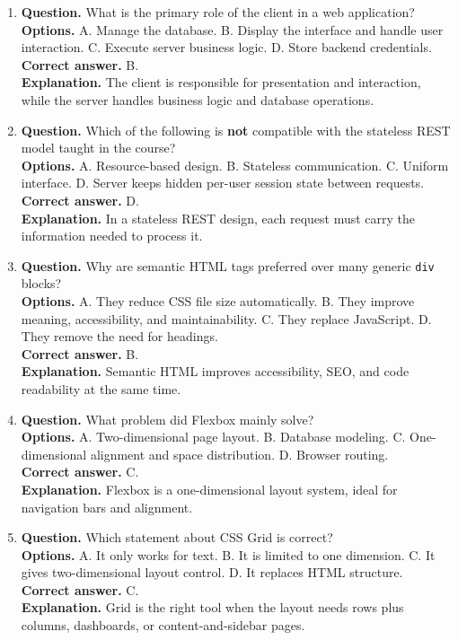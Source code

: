 \documentclass[11pt,a4paper]{article}
\begin{document}
\begin{enumerate}
  \item \textbf{Question.} What is the primary role of the client in a web application?\\
  \textbf{Options.} A. Manage the database. B. Display the interface and handle user interaction. C. Execute server business logic. D. Store backend credentials.\\
  \textbf{Correct answer.} B.\\
  \textbf{Explanation.} The client is responsible for presentation and interaction, while the server handles business logic and database operations.

  \item \textbf{Question.} Which of the following is \textbf{not} compatible with the stateless REST model taught in the course?\\
  \textbf{Options.} A. Resource-based design. B. Stateless communication. C. Uniform interface. D. Server keeps hidden per-user session state between requests.\\
  \textbf{Correct answer.} D.\\
  \textbf{Explanation.} In a stateless REST design, each request must carry the information needed to process it.

  \item \textbf{Question.} Why are semantic HTML tags preferred over many generic \texttt{div} blocks?\\
  \textbf{Options.} A. They reduce CSS file size automatically. B. They improve meaning, accessibility, and maintainability. C. They replace JavaScript. D. They remove the need for headings.\\
  \textbf{Correct answer.} B.\\
  \textbf{Explanation.} Semantic HTML improves accessibility, SEO, and code readability at the same time.

  \item \textbf{Question.} What problem did Flexbox mainly solve?\\
  \textbf{Options.} A. Two-dimensional page layout. B. Database modeling. C. One-dimensional alignment and space distribution. D. Browser routing.\\
  \textbf{Correct answer.} C.\\
  \textbf{Explanation.} Flexbox is a one-dimensional layout system, ideal for navigation bars and alignment.

  \item \textbf{Question.} Which statement about CSS Grid is correct?\\
  \textbf{Options.} A. It only works for text. B. It is limited to one dimension. C. It gives two-dimensional layout control. D. It replaces HTML structure.\\
  \textbf{Correct answer.} C.\\
  \textbf{Explanation.} Grid is the right tool when the layout needs rows plus columns, dashboards, or content-and-sidebar pages.


\end{enumerate}
\end{document}
